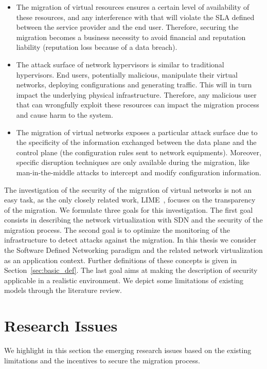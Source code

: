 \begin{itemize}
    
    \item The migration of virtual resources ensures a certain level of availability of these resources, and any interference with that will violate the SLA defined between the service provider and the end user.
    Therefore, securing the migration becomes a business necessity to avoid financial and reputation liability (\eg reputation loss because of a data breach).
    
    \item The attack surface of network hypervisors is similar to traditional hypervisors. End users, potentially malicious, manipulate their virtual networks, deploying configurations and generating traffic. This will in turn impact the underlying physical infrastructure. Therefore, any malicious user that can wrongfully exploit these resources can impact the migration process and cause harm to the system.

    \item The migration of virtual networks exposes a particular attack surface due to the specificity of the information exchanged between the data plane and the control plane (\eg the configuration rules sent to network equipments). Moreover, specific disruption techniques are only available during the migration, like man-in-the-middle attacks to intercept and modify configuration information.  
\end{itemize}

The investigation of the security of the migration of virtual networks is not an easy task, as the only closely related work, LIME~\cite{Lime-Ghorbani2014}, focuses on the transparency of the migration. 
We formulate three goals for this investigation.
The first goal consists in describing the network virtualization with SDN and the security of the migration process.
The second goal is to optimize the monitoring of the infrastructure to detect attacks against the migration. In this thesis we consider the Software Defined Networking paradigm and the related network virtualization as an application context. Further definitions of these concepts is given in Section~\ref{sec:basic_def}. 
The last goal aims at making the description of security applicable in a realistic environment.
We depict some limitations of existing models through the literature review.


\section{Research Issues}
We highlight in this section the emerging research issues based on the existing limitations and the incentives to secure the migration process.

